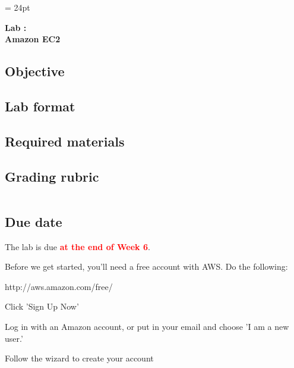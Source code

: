 \documentclass{article}
\newcommand{\labduedate}{at the end of Week 6}
\begin{document}
\chead{\textcolor{Gray}{CSSE491 -- Scalable Computing Lab Assignment}}
\headsep = 24pt

\begin{center}
{ \large
\textbf{Lab \labnumber: \longproductname} \\
\textbf{Amazon EC2}
}
\end{center}

\subsection*{Objective}

\subsection*{Lab format}

\subsection*{Required materials}

\subsection*{Grading rubric}
\begin{tabular}{p{5.5in} r}
\end{tabular}

\subsection*{Due date}
The lab is due \textcolor{red}{\textbf{\labduedate}}.




Before we get started, you'll need a free account with AWS. Do the following:

\begin{enumerate*}
\item http://aws.amazon.com/free/
\item Click 'Sign Up Now'
\item Log in with an Amazon account, or put in your email and choose 'I am a new user.'
\item Follow the wizard to create your account
\end{enumerate*}
\end{document}

